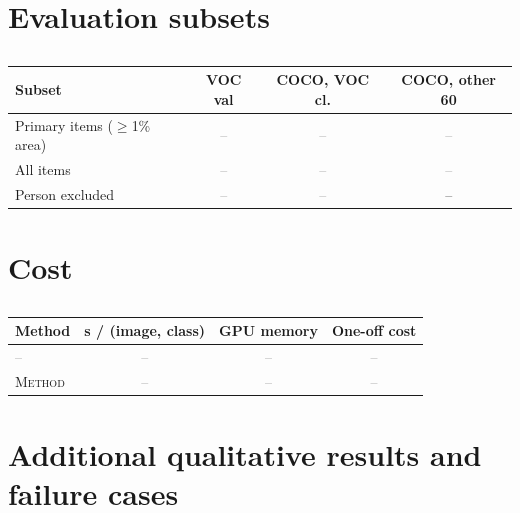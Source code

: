 \documentclass[runningheads]{llncs}
\newcommand{\method}{\textsc{Method}}          %
\newcommand{\x}{\textcolor{gray}{--}}          %
\newcommand{\figbox}[2]{\fbox{\parbox[c][#2][c]{0.95\linewidth}{\centering\small\textcolor{gray}{#1}}}}
\begin{document}
\section{Evaluation subsets}
\label{sec:s-subsets}

\begin{table}[h]
\centering
\caption{}
\label{tab:s-subsets}
\footnotesize\setlength{\tabcolsep}{3pt}
\begin{tabular}{@{}lccc@{}}
\toprule
Subset & VOC val & COCO, VOC cl. & COCO, other 60 \\
\midrule
Primary items ($\geq$1\% area) & \x & \x & \x \\
All items                      & \x & \x & \x \\
Person excluded                & \x & \x & -- \\
\bottomrule
\end{tabular}
\end{table}

\section{Cost}
\label{sec:s-cost}

\begin{table}[h]
\centering
\caption{}
\label{tab:s-cost}
\footnotesize
\begin{tabular}{@{}lccc@{}}
\toprule
Method & s / (image, class) & GPU memory & One-off cost \\
\midrule
\x & \x & \x & \x \\
\method{} & \x & \x & \x \\
\bottomrule
\end{tabular}
\end{table}

\section{Additional qualitative results and failure cases}
\label{sec:s-qualitative}

\begin{figure}[h]
\centering
\figbox{Gallery: more seen and unseen classes; failure cases (ambiguous words, small objects, co-occurring classes).}{5cm}
\caption{}
\label{fig:s-gallery}
\end{figure}
\end{document}
